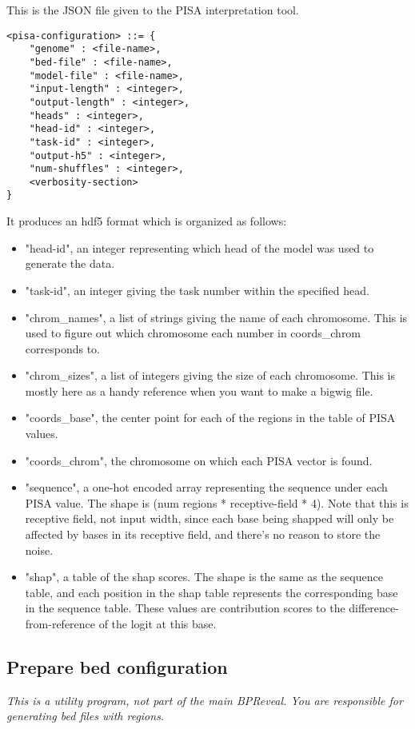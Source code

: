 \documentclass{article}
\begin{document}
This is the JSON file given to the PISA interpretation tool. 
\begin{lstlisting}
<pisa-configuration> ::= {
    "genome" : <file-name>,
    "bed-file" : <file-name>,
    "model-file" : <file-name>,
    "input-length" : <integer>,
    "output-length" : <integer>,
    "heads" : <integer>,
    "head-id" : <integer>,
    "task-id" : <integer>,
    "output-h5" : <integer>,
    "num-shuffles" : <integer>,
    <verbosity-section>
}
\end{lstlisting}

It produces an hdf5 format which is organized as follows:
\begin{itemize}
    \item "head-id", an integer representing which head of the model was used to generate the data.
    \item "task-id", an integer giving the task number within the specified head. 
    \item "chrom\_names", a list of strings giving the name of each chromosome. This is used to figure out which chromosome each number in coords\_chrom corresponds to. 
    \item "chrom\_sizes", a list of integers giving the size of each chromosome. This is mostly here as a handy reference when you want to make a bigwig file. 
    \item "coords\_base", the center point for each of the regions in the table of PISA values. 
    \item "coords\_chrom", the chromosome on which each PISA vector is found. 
    \item "sequence", a one-hot encoded array representing the sequence under each PISA value. The shape is (num regions * receptive-field * 4). Note that this is receptive field, not input width, since each base being shapped will only be affected by bases in its receptive field, and there's no reason to store the noise. 
    \item "shap", a table of the shap scores. The shape is the same as the sequence table, and each position in the shap table represents the corresponding base in the sequence table. These values are contribution scores to the difference-from-reference of the logit at this base. 

\end{itemize}



\subsection{Prepare bed configuration}
\emph{This is a utility program, not part of the main BPReveal. You are responsible for generating bed files with regions.}
\end{document}
